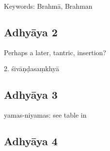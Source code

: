  Keywords: Brahmā, Brahman
%

 
\subsection{Adhyāya 2}\label{contents_of_ch02}
Perhaps a later, tantric, insertion?

  2. śivāṇḍasaṃkhyā 

\subsection{Adhyāya 3}\label{contents_of_ch03}
  yamas-niyamas: see table in 

\subsection{Adhyāya 4}\label{contents_of_ch04}
